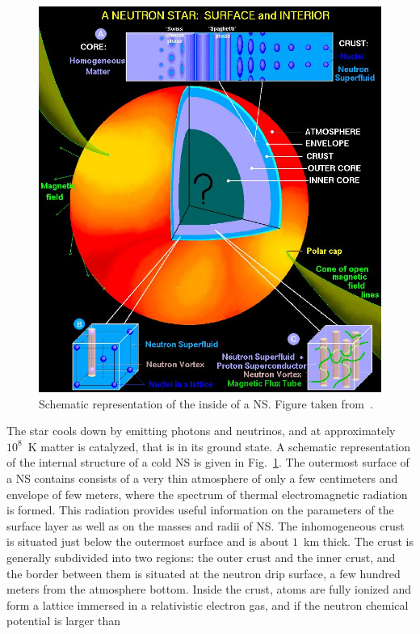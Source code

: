 \begin{figure}[!t]
\begin{center}
  \includegraphics[width=0.8\linewidth]{figures/NStarInt.jpeg}
\end{center}
\caption[Schematic representation of the inside of a neutron star]{Schematic
representation of the inside of a NS. Figure taken 
from~\cite{Page2006}.}\label{fig:NStarInt}
\end{figure}
% 
The star cools down by emitting photons and neutrinos, and at approximately
$10^8$~K matter is catalyzed, that is in its ground state.
A schematic representation of the internal structure of a cold NS is given in
Fig.~\ref{fig:NStarInt}.
The outermost surface of a NS contains consists of a very thin atmosphere of 
only a few centimeters and envelope of few meters, where the spectrum of
thermal electromagnetic radiation is formed. This radiation provides useful 
information on the parameters of the surface layer as well as on the masses and 
radii of NS. 
The inhomogeneous crust is situated just below the outermost surface and is 
about $1$~km thick. 
The crust is generally subdivided into two regions: the outer crust and the 
inner crust, and the border between them is situated at the neutron drip 
surface, a few hundred meters from the atmosphere bottom.
Inside the crust, atoms are fully ionized and form a lattice immersed in a
relativistic electron gas, and if the neutron chemical potential is larger than 

